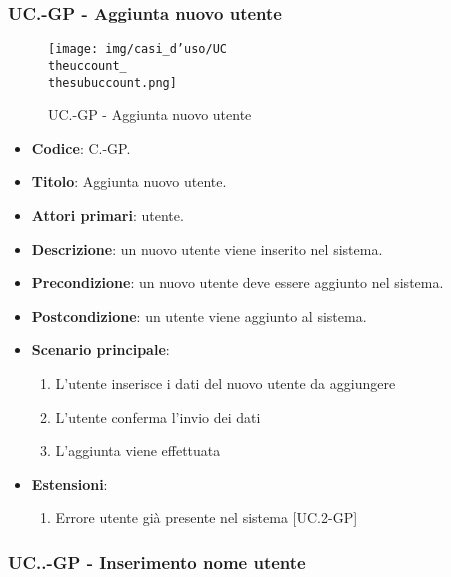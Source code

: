	\subsubsection{UC\theuccount.\thesubuccount-GP - Aggiunta nuovo utente}
		\begin{figure}[H]
			\centering
			\texttt{[image: img/casi\_d'uso/UC\\theuccount\_\\thesubuccount.png]}\\
			\caption{UC\theuccount.\thesubuccount-GP - Aggiunta nuovo utente}
		\end{figure}
		\begin{itemize}
			\item \textbf{Codice}: C\theuccount.\thesubuccount-GP.
			\item \textbf{Titolo}: Aggiunta nuovo utente.
			\item \textbf{Attori primari}: utente.
			\item \textbf{Descrizione}: un nuovo utente viene inserito nel sistema.
			\item \textbf{Precondizione}: un nuovo utente deve essere aggiunto nel sistema.
			\item \textbf{Postcondizione}: un utente viene aggiunto al sistema.
			\item \textbf{Scenario principale}:
			\begin{enumerate}
				\item L'utente inserisce i dati del nuovo utente da aggiungere
				\item L'utente conferma l'invio dei dati
				\item L'aggiunta viene effettuata
			\end{enumerate}
			\item \textbf{Estensioni}:
			\begin{enumerate}
				\item Errore utente già presente nel sistema [UC\theuccount.2-GP]
			\end{enumerate}
		\end{itemize}

		\subsubsection{UC\theuccount.\thesubuccount.\thesubsubuccount-GP - Inserimento nome utente}


